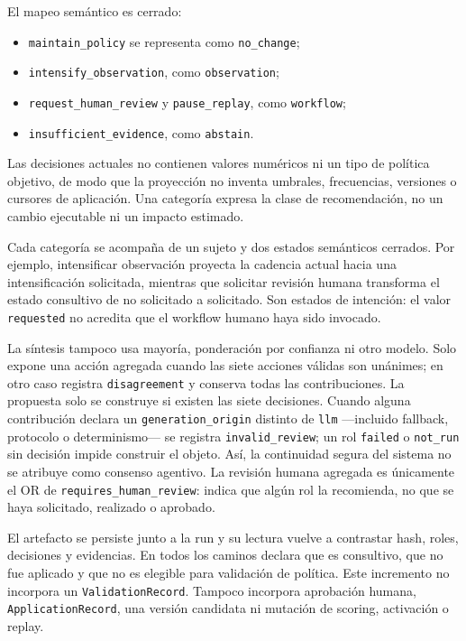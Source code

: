 El mapeo semántico es cerrado:
\begin{itemize}
  \item \nolinkurl{maintain_policy} se representa como \texttt{no\_change};
  \item \nolinkurl{intensify_observation}, como \texttt{observation};
  \item \nolinkurl{request_human_review} y \nolinkurl{pause_replay}, como
        \texttt{workflow};
  \item \nolinkurl{insufficient_evidence}, como \texttt{abstain}.
\end{itemize}
Las decisiones actuales no contienen valores numéricos ni un tipo de política
objetivo, de modo que la proyección no inventa umbrales, frecuencias, versiones
o cursores de aplicación. Una categoría expresa la clase de recomendación, no
un cambio ejecutable ni un impacto estimado.

Cada categoría se acompaña de un sujeto y dos estados semánticos cerrados. Por
ejemplo, intensificar observación proyecta la cadencia actual hacia una
intensificación solicitada, mientras que solicitar revisión humana transforma
el estado consultivo de no solicitado a solicitado. Son estados de intención:
el valor \texttt{requested} no acredita que el workflow humano haya sido
invocado.

La síntesis tampoco usa mayoría, ponderación por confianza ni otro modelo. Solo
expone una acción agregada cuando las siete acciones válidas son unánimes; en
otro caso registra \texttt{disagreement} y conserva todas las contribuciones.
La propuesta solo se construye si existen las siete decisiones. Cuando alguna
contribución declara un \texttt{generation\_origin} distinto de
\texttt{llm} ---incluido fallback, protocolo o determinismo--- se registra
\texttt{invalid\_review}; un rol \texttt{failed} o \texttt{not\_run} sin
decisión impide construir el objeto. Así, la continuidad segura del sistema no
se atribuye como consenso agentivo. La revisión humana agregada es únicamente
el OR de \texttt{requires\_human\_review}: indica que algún rol la recomienda,
no que se haya solicitado, realizado o aprobado.

El artefacto se persiste junto a la run y su lectura vuelve a contrastar hash,
roles, decisiones y evidencias. En todos los caminos declara que es consultivo,
que no fue aplicado y que no es elegible para validación de política. Este
incremento no incorpora un \texttt{ValidationRecord}. Tampoco incorpora
aprobación humana, \texttt{ApplicationRecord}, una versión candidata ni
mutación de scoring, activación o replay.

